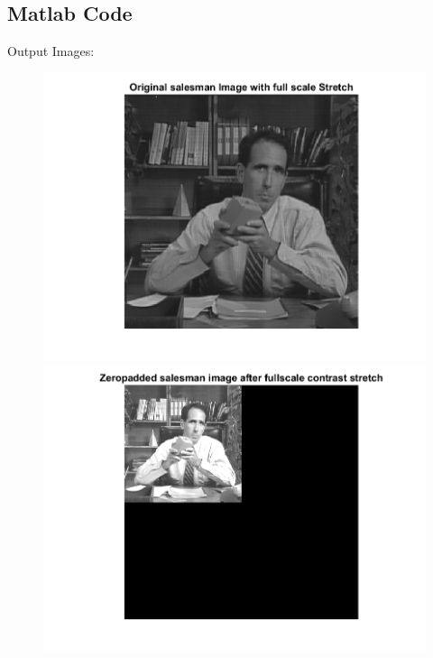\documentclass[11pt]{article} %
\begin{document}
\subsection*{Matlab Code}

Output Images: 
\begin{figure}
 \centering
	\includegraphics{1ca.png}
	\includegraphics{1cb.png}
\end{figure}
\end{document}
